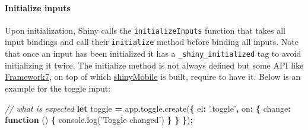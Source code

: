 \documentclass[]{book}
\newenvironment{Shaded}{\begin{snugshade}}{\end{snugshade}}
\newcommand{\AttributeTok}[1]{\textcolor[rgb]{0.77,0.63,0.00}{#1}}
\newcommand{\CommentTok}[1]{\textcolor[rgb]{0.56,0.35,0.01}{\textit{#1}}}
\newcommand{\ControlFlowTok}[1]{\textcolor[rgb]{0.13,0.29,0.53}{\textbf{#1}}}
\newcommand{\DataTypeTok}[1]{\textcolor[rgb]{0.13,0.29,0.53}{#1}}
\newcommand{\KeywordTok}[1]{\textcolor[rgb]{0.13,0.29,0.53}{\textbf{#1}}}
\newcommand{\NormalTok}[1]{#1}
\newcommand{\OperatorTok}[1]{\textcolor[rgb]{0.81,0.36,0.00}{\textbf{#1}}}
\newcommand{\StringTok}[1]{\textcolor[rgb]{0.31,0.60,0.02}{#1}}
\newcommand{\VariableTok}[1]{\textcolor[rgb]{0.00,0.00,0.00}{#1}}
\let\oldparagraph\paragraph
\renewcommand{\paragraph}[1]{\oldparagraph{#1}\mbox{}}
\begin{document}
\begin{Shaded}
\end{Shaded}

\hypertarget{initialize-inputs}{%
\paragraph{Initialize inputs}\label{initialize-inputs}}

Upon initialization, Shiny calls the \texttt{initializeInputs} function that takes all input bindings and call their \texttt{initialize} method before binding all inputs. Note that once an input has been initialized it has a \texttt{\_shiny\_initialized} tag to avoid initializing it twice. The initialize method is not always defined but some API like \href{https://framework7.io}{Framework7}, on top of which \href{https://github.com/RinteRface/shinyMobile}{shinyMobile} is built, require to have it. Below is an example for the toggle input:

\begin{Shaded}
\begin{Highlighting}[]
\CommentTok{// what is expected}
\KeywordTok{let}\NormalTok{ toggle }\OperatorTok{=} \VariableTok{app}\NormalTok{.}\VariableTok{toggle}\NormalTok{.}\AttributeTok{create}\NormalTok{(}\OperatorTok{\{}
  \DataTypeTok{el}\OperatorTok{:} \StringTok{'.toggle'}\OperatorTok{,}
  \DataTypeTok{on}\OperatorTok{:} \OperatorTok{\{}
    \DataTypeTok{change}\OperatorTok{:} \KeywordTok{function}\NormalTok{ () }\OperatorTok{\{}
      \VariableTok{console}\NormalTok{.}\AttributeTok{log}\NormalTok{(}\StringTok{'Toggle changed'}\NormalTok{)}
    \OperatorTok{\}}
  \OperatorTok{\}}
\OperatorTok{\}}\NormalTok{)}\OperatorTok{;}
\end{Highlighting}
\end{Shaded}
\end{document}
